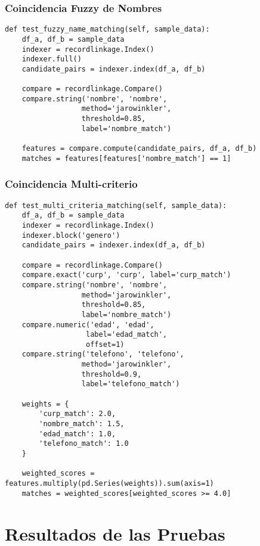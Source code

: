 \documentclass[12pt]{article}
\begin{document}
\subsubsection{Coincidencia Fuzzy de Nombres}
\begin{lstlisting}[caption=Prueba de coincidencia fuzzy de nombres]
def test_fuzzy_name_matching(self, sample_data):
    df_a, df_b = sample_data
    indexer = recordlinkage.Index()
    indexer.full()
    candidate_pairs = indexer.index(df_a, df_b)
    
    compare = recordlinkage.Compare()
    compare.string('nombre', 'nombre', 
                  method='jarowinkler', 
                  threshold=0.85,
                  label='nombre_match')
    
    features = compare.compute(candidate_pairs, df_a, df_b)
    matches = features[features['nombre_match'] == 1]
\end{lstlisting}

\subsubsection{Coincidencia Multi-criterio}
\begin{lstlisting}[caption=Prueba de coincidencia multi-criterio con pesos]
def test_multi_criteria_matching(self, sample_data):
    df_a, df_b = sample_data
    indexer = recordlinkage.Index()
    indexer.block('genero')
    candidate_pairs = indexer.index(df_a, df_b)
    
    compare = recordlinkage.Compare()
    compare.exact('curp', 'curp', label='curp_match')
    compare.string('nombre', 'nombre', 
                  method='jarowinkler', 
                  threshold=0.85,
                  label='nombre_match')
    compare.numeric('edad', 'edad', 
                   label='edad_match',
                   offset=1)
    compare.string('telefono', 'telefono', 
                  method='jarowinkler', 
                  threshold=0.9,
                  label='telefono_match')
    
    weights = {
        'curp_match': 2.0,
        'nombre_match': 1.5,
        'edad_match': 1.0,
        'telefono_match': 1.0
    }
    
    weighted_scores = features.multiply(pd.Series(weights)).sum(axis=1)
    matches = weighted_scores[weighted_scores >= 4.0]
\end{lstlisting}

\section{Resultados de las Pruebas}
\end{document}
